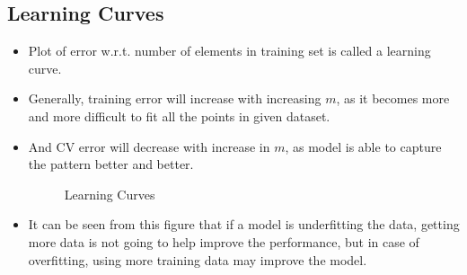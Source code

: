 \documentclass{article}
\begin{document}
\subsection{Learning Curves}
\begin{itemize}
	\item Plot of error w.r.t. number of elements in training set is called a learning curve.
	\item Generally, training error will increase with increasing $m$, as it becomes more and more difficult to fit all the points in given dataset.
	\item And CV error will decrease with increase in $m$, as model is able to capture the pattern better and better.
	\begin{figure}[h]
		\centering
		\caption{Learning Curves}
		\label{}
	\end{figure}
	\item It can be seen from this figure that if a model is underfitting the data, getting more data is not going to help improve the performance, but in case of overfitting, using more training data may improve the model.

\end{itemize}
\end{document}
